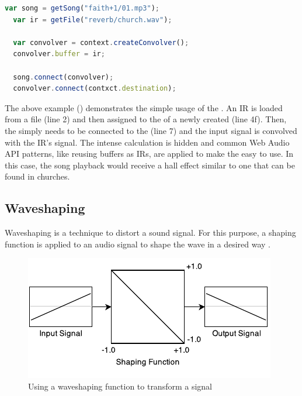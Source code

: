 \begin{lstlisting}[language=JavaScript, caption=ConvolverNode usage, label=lst:convolver-node]
  var song = getSong("faith+1/01.mp3");
  var ir = getFile("reverb/church.wav");

  var convolver = context.createConvolver();
  convolver.buffer = ir;

  song.connect(convolver);
  convolver.connect(contxct.destination);
\end{lstlisting}

The above example () demonstrates the simple usage of the . An IR is loaded from a file (line 2) and then assigned to the  of a newly created  (line 4f). Then, the  simply needs to be connected to the  (line 7) and the input signal is convolved with the IR's signal. The intense calculation is hidden and common Web Audio API patterns, like reusing buffers as IRs, are applied to make the  easy to use. In this case, the song playback would receive a hall effect similar to one that can be found in churches.

\subsection{Waveshaping}

Waveshaping is a technique to distort a sound signal. For this purpose, a shaping function is applied to an audio signal to shape the wave in a desired way \cite[p. 252]{curtis1996computer}.

\begin{figure}[htb]
  \centerline{\includegraphics[width=0.75\linewidth]{images/waveshaping.pdf}}
  \caption[Using a waveshaping function to transform a signal -
  \protect{}]{Using a waveshaping function to transform a signal}
  \label{fig:waveshaping}
\end{figure}

